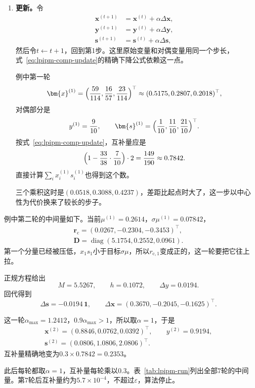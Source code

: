 \begin{enumerate}
 \item \textbf{更新。}令
 \begin{equation}
  \begin{aligned}
  \bm{x}^{(t+1)}&=\bm{x}^{(t)}+\alpha\Delta\bm{x},\\
  \bm{y}^{(t+1)}&=\bm{y}^{(t)}+\alpha\Delta\bm{y},\\
  \bm{s}^{(t+1)}&=\bm{s}^{(t)}+\alpha\Delta\bm{s},
  \end{aligned}
  \label{eq:lpipm-update}
 \end{equation}
 然后令$t\leftarrow t+1$，回到第1步。这里原始变量和对偶变量用同一个步长，式~\eqref{eq:lpipm-comp-update}的精确下降公式依赖这一点。

 例中第一轮
 \[
  \bm{x}^{(1)}=\Bigl(\frac{59}{114},\frac{16}{57},\frac{23}{114}\Bigr)^\top\approx(0.5175,0.2807,0.2018)^\top,
 \]
 对偶部分是
 \[
  y^{(1)}=\frac{9}{10},\qquad\bm{s}^{(1)}=\Bigl(\frac{1}{10},\frac{11}{10},\frac{21}{10}\Bigr)^\top.
 \]
 按式~\eqref{eq:lpipm-comp-update}，互补量应是
 \[
  \Bigl(1-\frac{33}{38}\cdot\frac{7}{10}\Bigr)\cdot2=\frac{149}{190}\approx0.7842.
 \]
 直接计算$\sum_ix_i^{(1)}s_i^{(1)}$也得到这个数。

 三个乘积这时是$(0.0518,0.3088,0.4237)$，差距比起点时大了，这一步以中心性为代价换来了较长的步子。
\end{enumerate}

例中第二轮的中间量如下。当前$\mu^{(1)}=0.2614$，$\sigma\mu^{(1)}=0.07842$，
\[
 \begin{gathered}
 \bm{r}_{\mathrm{c}}=(0.0267,-0.2304,-0.3453)^\top,\\
 \bm{D}=\operatorname{diag}(5.1754,0.2552,0.0961).
 \end{gathered}
\]
第一个分量已经被压低，$x_1s_1$小于目标$\sigma\mu$，所以$r_{\mathrm{c},1}$变成正的，这一轮要把它往上拉。

正规方程给出
\[
 M=5.5267,\qquad h=0.1072,\qquad\Delta y=0.0194.
\]
回代得到
\[
 \Delta\bm{s}=-0.0194\,\bm{1},\qquad\Delta\bm{x}=(0.3670,-0.2045,-0.1625)^\top.
\]

这一轮$\alpha_{\max}=1.2412$，$0.9\alpha_{\max}>1$，所以取$\alpha=1$，于是
\[
 \begin{gathered}
 \bm{x}^{(2)}=(0.8846,0.0762,0.0392)^\top,\qquad y^{(2)}=0.9194,\\
 \bm{s}^{(2)}=(0.0806,1.0806,2.0806)^\top.
 \end{gathered}
\]
互补量精确地变为$0.3\times0.7842=0.2353$。

此后每轮都取$\alpha=1$，互补量每轮乘以$0.3$。表~\ref{tab:lpipm-run}列出全部$7$轮的中间量。第$7$轮后互补量约为$5.7\times10^{-4}$，不超过$\varepsilon$，算法停止。

